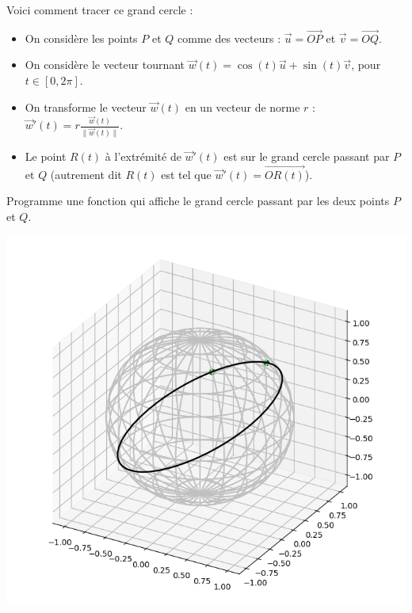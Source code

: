 \documentclass[11pt,class=report,crop=false]{standalone}
\begin{document}
\begin{activite}
\begin{enumerate}
	Voici comment tracer ce grand cercle :
	\begin{itemize}
		\item On considère les points $P$ et $Q$ comme des vecteurs : $\vec u = \overrightarrow{OP}$ et 
		$\vec v = \overrightarrow{OQ}$.
		\item On considère le vecteur tournant $\vec{w}(t) = \cos(t)\vec{u}+\sin(t)\vec{v}$, pour $t\in[0,2\pi]$.
		\item On transforme le vecteur $\vec{w}(t)$ en un vecteur de norme $r$ : $\vec{w}'(t) = r \frac{\vec{w}(t)}{\| \vec{w}(t) \|}$.
		\item Le point $R(t)$ à l'extrémité de $\vec{w}'(t)$ est sur le grand cercle passant par $P$ et $Q$ (autrement dit $R(t)$ est tel que $\vec{w}'(t) = \overrightarrow{OR(t)}$).
	\end{itemize}

	Programme une fonction  qui affiche le grand cercle passant par les deux points $P$ et $Q$.
	
	\begin{center}
	    \includegraphics[scale=\myscale,scale=0.3]{ecran-sphere-4newnew}
    \end{center}	
	
\end{enumerate}
	
\end{activite}
\end{document}
